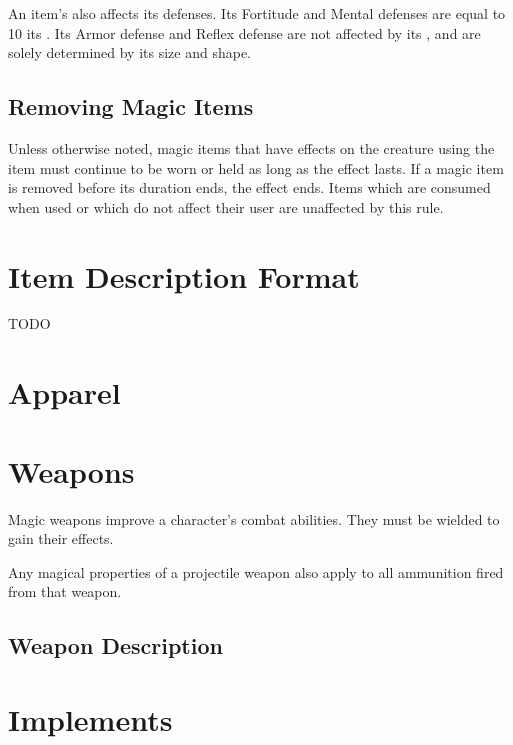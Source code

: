         An item's  also affects its defenses.
        Its Fortitude and Mental defenses are equal to 10 \add its .
        Its Armor defense and Reflex defense are not affected by its , and are solely determined by its size and shape.

    \subsection{Removing Magic Items}
        Unless otherwise noted, magic items that have effects on the creature using the item must continue to be worn or held as long as the effect lasts.
        If a magic item is removed before its duration ends, the effect ends.
        Items which are consumed when used or which do not affect their user are unaffected by this rule.

\section{Item Description Format}
    TODO

\section{Apparel}

    

    

\section{Weapons} %
    Magic weapons improve a character's combat abilities.
    They must be wielded to gain their effects.

     Any magical properties of a projectile weapon also apply to all ammunition fired from that weapon.

    \subsection{Weapon Description}

        

        

\section{Implements}

